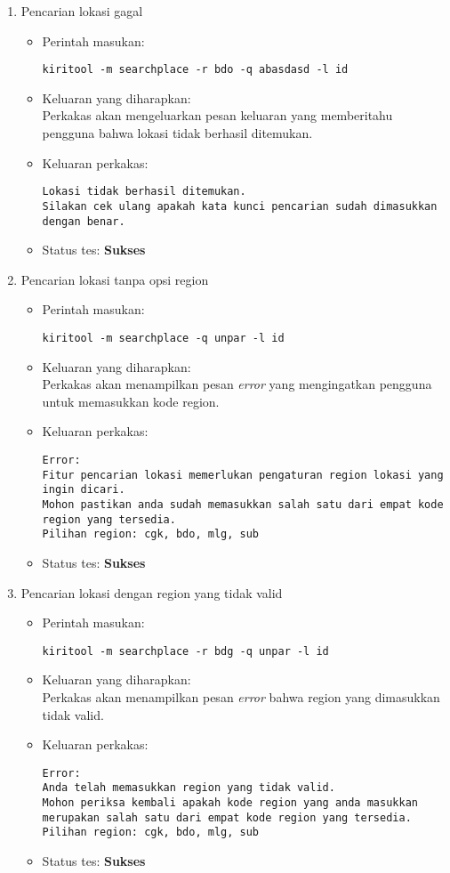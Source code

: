 \begin{enumerate}
	\item Pencarian lokasi gagal
	\begin{itemize}
		\item Perintah masukan:
		\begin{verbatim}
kiritool -m searchplace -r bdo -q abasdasd -l id
		\end{verbatim}
		\item Keluaran yang diharapkan: \\
		Perkakas akan mengeluarkan pesan keluaran yang memberitahu pengguna bahwa lokasi tidak berhasil ditemukan.
		\item Keluaran perkakas:
		\begin{lstlisting}
Lokasi tidak berhasil ditemukan.
Silakan cek ulang apakah kata kunci pencarian sudah dimasukkan dengan benar.
		\end{lstlisting}
		\item Status tes: \textbf{Sukses}
	\end{itemize}
	
	\item Pencarian lokasi tanpa opsi region
	\begin{itemize}
		\item Perintah masukan:
		\begin{verbatim}
kiritool -m searchplace -q unpar -l id
		\end{verbatim}
		\item Keluaran yang diharapkan: \\
		Perkakas akan menampilkan pesan \textit{error} yang mengingatkan pengguna untuk memasukkan kode region.
		\item Keluaran perkakas:
		\begin{lstlisting}
Error:
Fitur pencarian lokasi memerlukan pengaturan region lokasi yang ingin dicari.
Mohon pastikan anda sudah memasukkan salah satu dari empat kode region yang tersedia.
Pilihan region: cgk, bdo, mlg, sub
		\end{lstlisting}
		\item Status tes: \textbf{Sukses}
	\end{itemize}
	
	\item Pencarian lokasi dengan region yang tidak valid
	\begin{itemize}
		\item Perintah masukan:
		\begin{verbatim}
kiritool -m searchplace -r bdg -q unpar -l id
		\end{verbatim}
		\item Keluaran yang diharapkan: \\
		Perkakas akan menampilkan pesan \textit{error} bahwa region yang dimasukkan tidak valid.
		\item Keluaran perkakas:
		\begin{lstlisting}
Error:
Anda telah memasukkan region yang tidak valid.
Mohon periksa kembali apakah kode region yang anda masukkan merupakan salah satu dari empat kode region yang tersedia.
Pilihan region: cgk, bdo, mlg, sub
		\end{lstlisting}
		\item Status tes: \textbf{Sukses}
	\end{itemize}
	

\end{enumerate}
